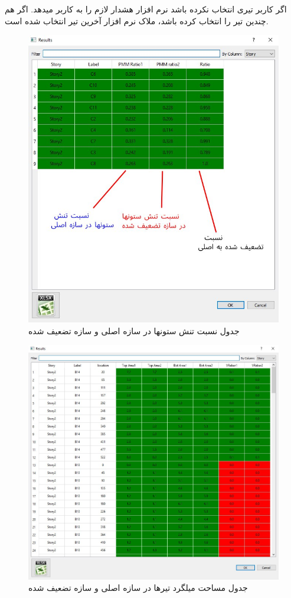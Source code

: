 اگر کاربر تیری انتخاب نکرده باشد نرم افزار هشدار لازم را به کاربر میدهد. اگر هم چندین تیر را انتخاب کرده باشد، ملاک نرم افزار آخرین تیر انتخاب شده است.

\begin{figure}
    \centering
    \includegraphics[scale=.7]{figures/weakness_column}
    \caption{جدول نسبت تنش ستونها در سازه اصلی و سازه تضعیف شده}
    \label{pic:weakness_column}
\end{figure}

\begin{figure}
    \centering
    \includegraphics[scale=.6]{figures/weakness_beam}
    \caption{جدول مساحت میلگرد تیرها در سازه اصلی و سازه تضعیف شده}
    \label{pic:weakness_beam}
\end{figure}
